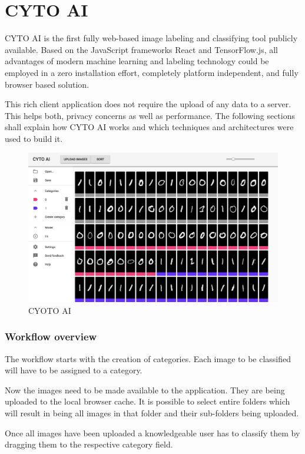 \chapter{CYTO AI}

CYTO AI is the first fully web-based image labeling and classifying tool publicly available. Based on the JavaScript frameworks React and TensorFlow.js,
all advantages of modern machine learning and labeling
technology could be employed in a zero installation effort,
completely platform independent, and fully browser based
solution.

This rich client application does not require the upload of
any data to a server. This helps both, privacy concerns as well as performance. The following sections shall explain how CYTO AI works and which techniques and architectures were used to build it.

\begin{figure}[H]
	\centering
	\includegraphics[width=0.8\linewidth]{bilder/cyto/cyto.png}
	\caption{CYOTO AI}
	\label{fig:COMPONENT}
\end{figure}


\subsection{Workflow overview}

The workflow starts with the creation of categories. Each image to be classified will have to be assigned to a category.

Now the images need to be made available to the application.
They are being uploaded to the local browser cache.
It is possible to select entire folders which will result in being all images in that folder and their sub-folders being uploaded.

Once all images have been uploaded a knowledgeable user has
to classify them by dragging them to the respective category field.

